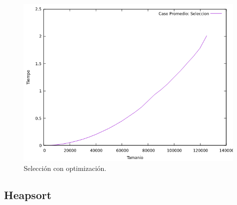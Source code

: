 \documentclass[a4paper,12pt,twoside]{article} %
\begin{document}
\begin{itemize}
\begin{figure}[h]
\begin{center}
  	\includegraphics[scale=0.8]{seleccion_me_co.png}
  	\caption{Selección con optimización.}
  	
  \end{center}
\end{figure}

\newpage
	
\end{itemize}
	
	\subsection{Heapsort}
	
\end{document}

